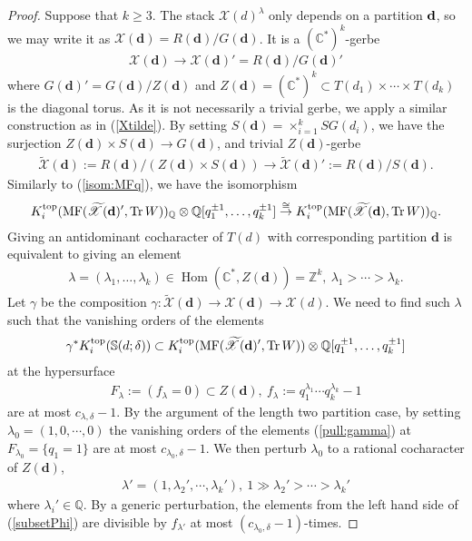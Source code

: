 \documentclass [11pt,oneside,a4paper,mathscr]{amsart}
\theoremstyle{definition}
\renewcommand{\geq}{\geqslant}
\newcommand{\X}{\mathscr{X}}
\newcommand{\Hom}{\operatorname{Hom}}
\newcommand{\Tr}{\mathop{\rm Tr}}
\begin{document}
\begin{proof}
Suppose that $k\geq 3$. The stack $\X(d)^{\lambda}$
only depends on a partition $\bf{d}$, so we may write it as 
$\X(\mathbf{d})=R(\mathbf{d})/G(\mathbf{d})$. It is a $(\mathbb{C}^{\ast})^k$-gerbe
\begin{align*}
    \X(\mathbf{d}) \to \X(\mathbf{d})'=R(\mathbf{d})/G(\mathbf{d})'
\end{align*}
where $G(\mathbf{d})'=G(\mathbf{d})/Z(\mathbf{d})$
and $Z(\mathbf{d})=(\mathbb{C}^{\ast})^k \subset T(d_1)\times \cdots \times T(d_k)$ is the diagonal 
torus. 
As it is not necessarily a trivial gerbe, we apply a similar construction 
as in (\ref{Xtilde}).
By setting $S(\mathbf{d})=\times_{i=1}^k SG(d_i)$, 
we have the surjection $Z(\mathbf{d}) \times S(\mathbf{d})\to G(\mathbf{d})$, 
and trivial $Z(\mathbf{d})$-gerbe
\begin{align*}
    \widetilde{\X}(\mathbf{d}):=R(\mathbf{d})/(Z(\mathbf{d})\times S(\mathbf{d})) \to 
    \widetilde{\X}(\mathbf{d})':=R(\mathbf{d})/S(\mathbf{d}). 
\end{align*}
Similarly to (\ref{isom:MFq}), we have the isomorphism 
\begin{align*}
K_i^{\rm{top}}(\mathrm{MF}(\widetilde{\X}(\mathbf{d})', \Tr W))_{\mathbb{Q}} \otimes \mathbb{Q}[q_1^{\pm 1}, \ldots, q_{k}^{\pm 1}] \stackrel{\cong}{\to} 
    K_i^{\rm{top}}(\mathrm{MF}(\widetilde{\X}(\mathbf{d}), \Tr W))_{\mathbb{Q}}. 
\end{align*}
Giving an antidominant cocharacter of $T(d)$ with corresponding partition $\mathbf{d}$
is equivalent to giving an element 
\begin{align}\label{lambda:Zd}
    \lambda=(\lambda_1, \ldots, \lambda_k) \in \Hom(\mathbb{C}^{\ast}, Z(\mathbf{d}))=\mathbb{Z}^k, \ 
    \lambda_1>\cdots>\lambda_k. 
\end{align}
Let $\gamma$ be the composition 
$\gamma \colon \widetilde{\X}(\mathbf{d}) \to \X(\mathbf{d}) \to \X(d)$. 
We need to find such $\lambda$ such that 
the vanishing orders of the elements 
\begin{align}\label{pull:gamma}
    \gamma^{\ast}K_i^{\rm{top}}(\mathbb{S}(d; \delta)) \subset 
    K_i^{\rm{top}}(\mathrm{MF}(\widetilde{\X}(\mathbf{d})', \Tr W)) \otimes \mathbb{Q}[q_1^{\pm 1}, \ldots, q_{k}^{\pm 1}]
\end{align}
at the hypersurface 
\begin{align*}
    F_{\lambda}:=(f_{\lambda}=0) \subset Z(\mathbf{d}), \ 
f_{\lambda} :=q_1^{\lambda_1}\cdots q_k^{\lambda_k}-1
\end{align*}
are
at most $c_{\lambda, \delta}-1$. 
By the argument of the length two partition case, 
by setting $\lambda_0=(1, 0, \cdots, 0)$
the vanishing orders of the elements (\ref{pull:gamma}) at $F_{\lambda_0}=\{q_1=1\}$ are at most $c_{\lambda_0, \delta}-1$. 
We then perturb $\lambda_0$ to a rational 
cocharacter of $Z(\mathbf{d})$, 
\begin{align*}
 \lambda'=(1, \lambda_2', \cdots, \lambda_k'), \ 1\gg \lambda_2'>\cdots>\lambda_k'
 \end{align*}
 where $\lambda_i' \in \mathbb{Q}$. By a generic perturbation, the elements 
 from the left hand side of (\ref{subsetPhi}) are divisible by 
 $f_{\lambda'}$ at most $(c_{\lambda_0, \delta}-1)$-times. 
 

\end{proof}
\end{document}
